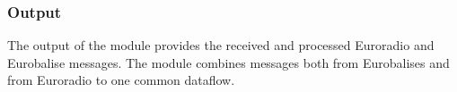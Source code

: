 \documentclass{template/openetcs_report}
\begin{document}
%  
%  
%  
%  
 




\subsubsection{Output}
The output of the module provides the received and processed Euroradio and Eurobalise messages. The module combines messages both from Eurobalises and from Euroradio to one common dataflow.
\end{document}

